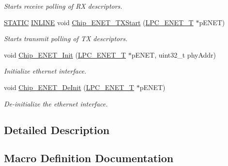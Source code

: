 \begin{DoxyCompactItemize}
\begin{DoxyCompactList}\small\item\em Starts receive polling of RX descriptors. \end{DoxyCompactList}\item 
\hyperlink{group___l_p_c___types___public___macros_ga10b2d890d871e1489bb02b7e70d9bdfb}{S\+T\+A\+T\+IC} \hyperlink{spifi__18xx__43xx_8h_a2eb6f9e0395b47b8d5e3eeae4fe0c116}{I\+N\+L\+I\+NE} void \hyperlink{group___e_n_e_t__18_x_x__43_x_x_gadb075c919f1870edd00a1f86cc2504b3}{Chip\+\_\+\+E\+N\+E\+T\+\_\+\+T\+X\+Start} (\hyperlink{struct_l_p_c___e_n_e_t___t}{L\+P\+C\+\_\+\+E\+N\+E\+T\+\_\+T} $\ast$p\+E\+N\+ET)
\begin{DoxyCompactList}\small\item\em Starts transmit polling of TX descriptors. \end{DoxyCompactList}\item 
void \hyperlink{group___e_n_e_t__18_x_x__43_x_x_ga99d0be52bb0716f996ec379d0000a0ae}{Chip\+\_\+\+E\+N\+E\+T\+\_\+\+Init} (\hyperlink{struct_l_p_c___e_n_e_t___t}{L\+P\+C\+\_\+\+E\+N\+E\+T\+\_\+T} $\ast$p\+E\+N\+ET, uint32\+\_\+t phy\+Addr)
\begin{DoxyCompactList}\small\item\em Initialize ethernet interface. \end{DoxyCompactList}\item 
void \hyperlink{group___e_n_e_t__18_x_x__43_x_x_ga94eb7a70f4023c83ca18e4e675ad0b32}{Chip\+\_\+\+E\+N\+E\+T\+\_\+\+De\+Init} (\hyperlink{struct_l_p_c___e_n_e_t___t}{L\+P\+C\+\_\+\+E\+N\+E\+T\+\_\+T} $\ast$p\+E\+N\+ET)
\begin{DoxyCompactList}\small\item\em De-\/initialize the ethernet interface. \end{DoxyCompactList}\end{DoxyCompactItemize}


\subsection{Detailed Description}


\subsection{Macro Definition Documentation}
\mbox{\label{group___e_n_e_t__18_x_x__43_x_x_gaf4e575958ecb11bb5fc3da230b8c16d3}} 
